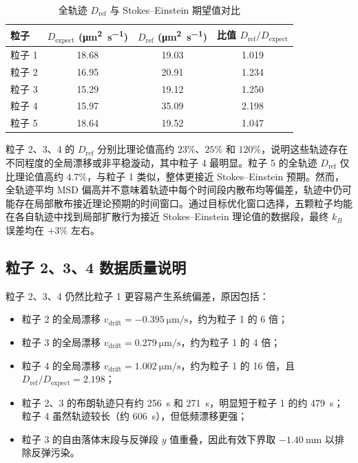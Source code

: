 \documentclass[12pt,a4paper]{ctexart}
\begin{document}
\begin{table}[h]
\centering
\caption{全轨迹 $D_\text{ref}$ 与 Stokes--Einstein 期望值对比}
\label{tab:dref_compare}
\begin{tabular}{lccc}
\toprule
粒子 & $D_\text{expect}$ (\si{\micro\metre^2\per\second}) & $D_\text{ref}$ (\si{\micro\metre^2\per\second}) & 比值 $D_\text{ref}/D_\text{expect}$ \\
\midrule
粒子 1 & 18.68 & 19.03 & 1.019 \\
粒子 2 & 16.95 & 20.91 & 1.234 \\
粒子 3 & 15.29 & 19.12 & 1.250 \\
粒子 4 & 15.97 & 35.09 & 2.198 \\
粒子 5 & 18.64 & 19.52 & 1.047 \\
\bottomrule
\end{tabular}
\end{table}

粒子 2、3、4 的 $D_\text{ref}$ 分别比理论值高约 $23\%$、$25\%$ 和 $120\%$，说明这些轨迹存在不同程度的全局漂移或非平稳漩动，其中粒子 4 最明显。粒子 5 的全轨迹 $D_\text{ref}$ 仅比理论值高约 $4.7\%$，与粒子 1 类似，整体更接近 Stokes--Einstein 预期。然而，全轨迹平均 MSD 偏高并不意味着轨迹中每个时间段内散布均等偏差，轨迹中仍可能存在局部散布接近理论预期的时间窗口。通过目标优化窗口选择，五颗粒子均能在各自轨迹中找到局部扩散行为接近 Stokes--Einstein 理论值的数据段，最终 $k_B$ 误差均在 $+3\%$ 左右。

\subsection{粒子 2、3、4 数据质量说明}

粒子 2、3、4 仍然比粒子 1 更容易产生系统偏差，原因包括：

\begin{itemize}[leftmargin=2em]
  \item 粒子 2 的全局漂移 $v_\text{drift}=\SI{-0.395}{\micro\metre\per\second}$，约为粒子 1 的 6 倍；
  \item 粒子 3 的全局漂移 $v_\text{drift}=\SI{0.279}{\micro\metre\per\second}$，约为粒子 1 的 4 倍；
  \item 粒子 4 的全局漂移 $v_\text{drift}=\SI{1.002}{\micro\metre\per\second}$，约为粒子 1 的 16 倍，且 $D_\text{ref}/D_\text{expect}=2.198$；
  \item 粒子 2、3 的布朗轨迹只有约 \SI{256}{\second} 和 \SI{271}{\second}，明显短于粒子 1 的约 \SI{479}{\second}；粒子 4 虽然轨迹较长（约 \SI{606}{\second}），但低频漂移更强；
  \item 粒子 3 的自由落体末段与反弹段 $y$ 值重叠，因此有效下界取 $\SI{-1.40}{\milli\metre}$ 以排除反弹污染。
\end{itemize}
\end{document}
